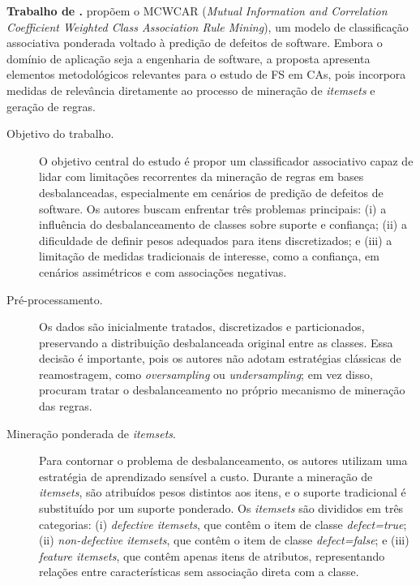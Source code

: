\textbf{Trabalho de .} 
 propõem o MCWCAR (\textit{Mutual Information and Correlation Coefficient Weighted Class Association Rule Mining}), um modelo de classificação associativa ponderada voltado à predição de defeitos de software. Embora o domínio de aplicação seja a engenharia de software, a proposta apresenta elementos metodológicos relevantes para o estudo de FS em CAs, pois incorpora medidas de relevância diretamente ao processo de mineração de \textit{itemsets} e geração de regras.

\begin{description}
    \item[Objetivo do trabalho.] O objetivo central do estudo é propor um classificador associativo capaz de lidar com limitações recorrentes da mineração de regras em bases desbalanceadas, especialmente em cenários de predição de defeitos de software. Os autores buscam enfrentar três problemas principais: (i) a influência do desbalanceamento de classes sobre suporte e confiança; (ii) a dificuldade de definir pesos adequados para itens discretizados; e (iii) a limitação de medidas tradicionais de interesse, como a confiança, em cenários assimétricos e com associações negativas.

    \item[Pré-processamento.] Os dados são inicialmente tratados, discretizados e particionados, preservando a distribuição desbalanceada original entre as classes. Essa decisão é importante, pois os autores não adotam estratégias clássicas de reamostragem, como \textit{oversampling} ou \textit{undersampling}; em vez disso, procuram tratar o desbalanceamento no próprio mecanismo de mineração das regras.

    \item[Mineração ponderada de \textit{itemsets}.] Para contornar o problema de desbalanceamento, os autores utilizam uma estratégia de aprendizado sensível a custo. Durante a mineração de \textit{itemsets}, são atribuídos pesos distintos aos itens, e o suporte tradicional é substituído por um suporte ponderado. Os \textit{itemsets} são divididos em três categorias: (i) \textit{defective itemsets}, que contêm o item de classe \textit{defect=true}; (ii) \textit{non-defective itemsets}, que contêm o item de classe \textit{defect=false}; e (iii) \textit{feature itemsets}, que contêm apenas itens de atributos, representando relações entre características sem associação direta com a classe.


\end{description}

